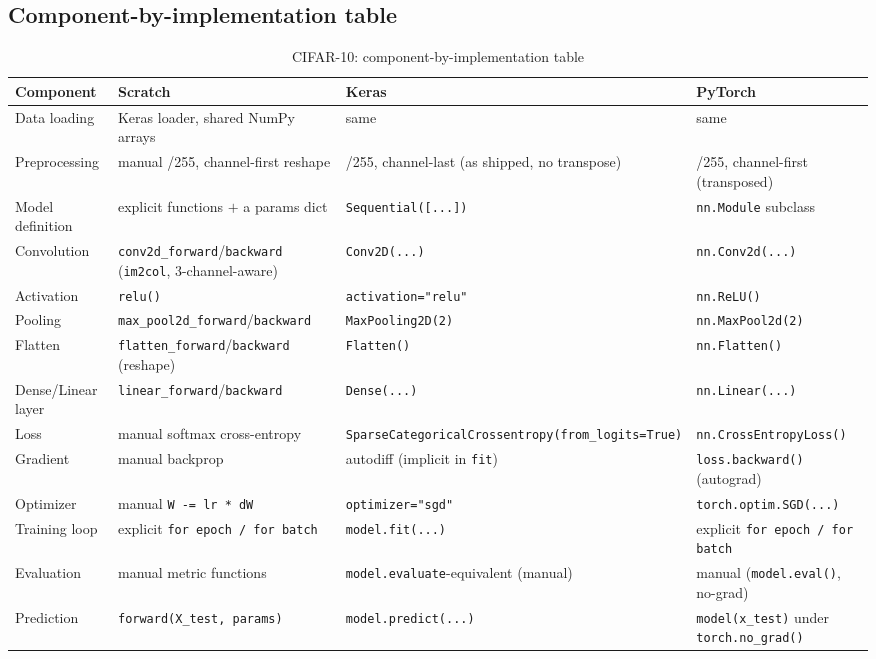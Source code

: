\documentclass[11pt]{article}
\newcommand{\code}[1]{\texttt{#1}}
\begin{document}
\subsection{Component-by-implementation table}

\begin{table}[H]
\centering
\caption{CIFAR-10: component-by-implementation table}
\footnotesize
\begin{tabular}{@{}p{2.5cm}p{4.1cm}p{4.1cm}p{4.1cm}@{}}
\toprule
Component & Scratch & Keras & PyTorch \\
\midrule
Data loading & Keras loader, shared NumPy arrays & same & same \\
Preprocessing & manual /255, channel-first reshape & /255, channel-last (as shipped, no transpose) & /255, channel-first (transposed) \\
Model definition & explicit functions $+$ a params dict & \code{Sequential([...])} & \code{nn.Module} subclass \\
Convolution & \code{conv2d\_forward}/\code{backward} (\code{im2col}, 3-channel-aware) & \code{Conv2D(...)} & \code{nn.Conv2d(...)} \\
Activation & \code{relu()} & \code{activation="relu"} & \code{nn.ReLU()} \\
Pooling & \code{max\_pool2d\_forward}/\code{backward} & \code{MaxPooling2D(2)} & \code{nn.MaxPool2d(2)} \\
Flatten & \code{flatten\_forward}/\code{backward} (reshape) & \code{Flatten()} & \code{nn.Flatten()} \\
Dense/Linear layer & \code{linear\_forward}/\code{backward} & \code{Dense(...)} & \code{nn.Linear(...)} \\
Loss & manual softmax cross-entropy & \code{SparseCategorical}\allowbreak\code{Crossentropy(}\allowbreak\code{from\_logits=True)} & \code{nn.CrossEntropyLoss()} \\
Gradient & manual backprop & autodiff (implicit in \code{fit}) & \code{loss.backward()} (autograd) \\
Optimizer & manual \code{W -= lr * dW} & \code{optimizer="sgd"} & \code{torch.optim.SGD(...)} \\
Training loop & explicit \code{for epoch / for batch} & \code{model.fit(...)} & explicit \code{for epoch / for batch} \\
Evaluation & manual metric functions & \code{model.evaluate}-equivalent (manual) & manual (\code{model.eval()}, no-grad) \\
Prediction & \code{forward(X\_test, params)} & \code{model.predict(...)} & \code{model(x\_test)} under \code{torch.no\_grad()} \\
\bottomrule
\end{tabular}
\end{table}
\end{document}
